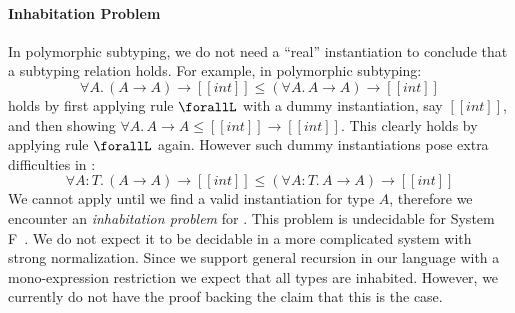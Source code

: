 \paragraph{Inhabitation Problem}

In polymorphic subtyping, we do not need a ``real'' instantiation to conclude
that a subtyping relation holds. For example, in polymorphic subtyping:
\begin{equation*}
    \forall A.\, (A \rightarrow A) \rightarrow [[int]] \le (\forall A.\, A \rightarrow A) \rightarrow [[int]]
\end{equation*}
\noindent holds by first applying rule $\forallL$ with a dummy instantiation,
say $[[int]]$, and then showing $\forall A.\, A \rightarrow A \le [[int]] \rightarrow [[int]]$.
This clearly holds by applying rule $\forallL$ again. However such dummy instantiations
pose extra difficulties in \name:
\begin{equation*}
    \forall A : T.\, (A \rightarrow A) \rightarrow [[int]] \le (\forall A : T.\, A \rightarrow A) \rightarrow [[int]]
\end{equation*}
We cannot apply  until we find a valid instantiation for type $A$,
therefore we encounter an \emph{inhabitation problem} for \name. This problem is
undecidable for System F~\cite{dudenhefner2019simpler}. We do not expect it to be
decidable in a more complicated system with strong normalization.
Since we support general recursion in our language with a mono-expression
restriction we expect that all types are
inhabited. However, we currently do not have the proof backing the claim that
this is the case.
